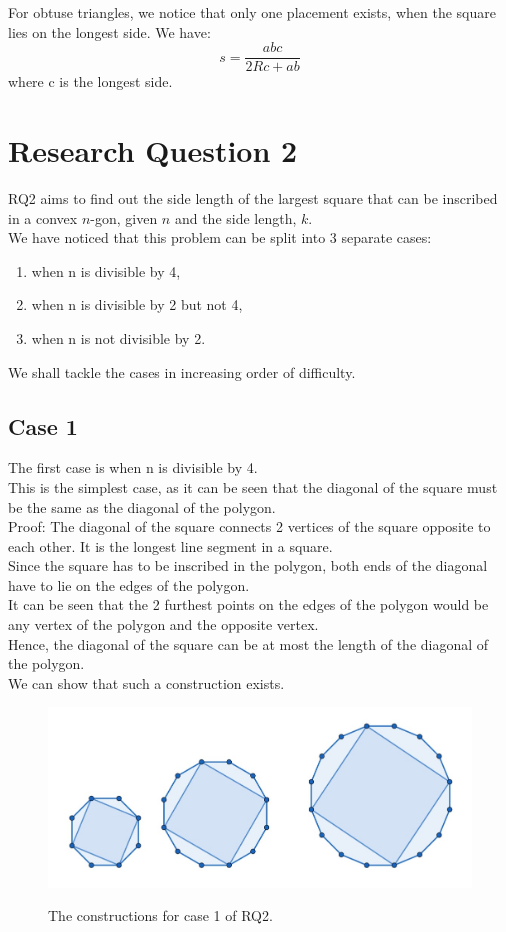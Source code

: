 \documentclass[12pt]{scrartcl}
\begin{document}
For obtuse triangles, we notice that only one placement exists, when the square lies on the longest side. We have:
\begin{equation}
	s = \dfrac{abc}{2Rc+ab}
\end{equation}
where c is the longest side.

\section{Research Question 2}

RQ2 aims to find out the side length of the largest
square that can be inscribed in a convex $n$-gon, given $n$ and the side length, $k$. \\

We have noticed that this problem can be split into 3 separate cases:
\begin{enumerate}
	\item when n is divisible by 4, 
	\item when n is divisible by 2 but not 4,
	\item when n is not divisible by 2.
\end{enumerate}
We shall tackle the cases in increasing order of difficulty.

\subsection{Case 1}

The first case is when n is divisible by 4. \\
This is the simplest case, as it can be seen that the diagonal of the square must be the same as the diagonal of the polygon. \\
Proof: The diagonal of the square connects 2 vertices of the square opposite to each other. It is the longest line segment in a square. \\
Since the square has to be inscribed in the polygon, both ends of the diagonal have to lie on the edges of the polygon. \\
It can be seen that the 2 furthest points on the edges of the polygon would be any vertex of the polygon and the opposite vertex. \\
Hence, the diagonal of the square can be at most the length of the diagonal of the polygon. \\
We can show that such a construction exists. 

\begin{figure}[htpb]
	\centering
	\includegraphics[scale=.75]{images/rq2_1_1.jpg}
	\label{fig:rq2_1_1_img}
	\caption{The constructions for case 1 of RQ2.}
\end{figure}
\end{document}

